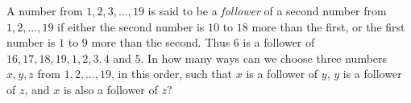 A number from $1,2,3,\dots,19$ is said to be a \emph{follower} of a second number from $1,2,\dots,19$ if either the second number is $10$ to $18$ more than the first, or the first number is $1$ to $9$ more than the second. Thus $6$ is a follower of $16,17,18,19,1,2,3,4$ and $5$. In how many ways can we choose three numbers $x,y,z$ from $1,2,\dots,19$, in this order, such that $x$ is a follower of $y$, $y$ is a follower of $z$, and $x$ is also a follower of $z$?
